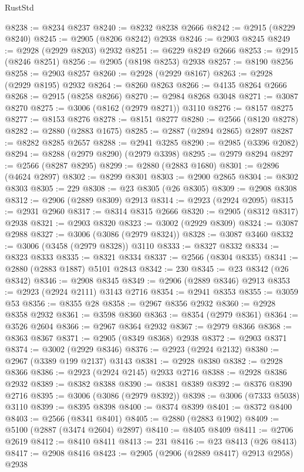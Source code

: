 \begin{lexlean}{RustStd}
\begin{coremodule}
@8238 := @8234 @8237
@8240 := @8232 @8238 @2666
@8242 := @2915 (@8229 @8240)
@8245 := @2905 (@8206 @8242) @2938
@8246 := @2903 @8245
@8249 := @2928 (@2929 @8203) @2932
@8251 := @6229 @8249 @2666
@8253 := @2915 (@8246 @8251)
@8256 := @2905 (@8198 @8253) @2938
@8257 := @8190 @8256
@8258 := @2903 @8257
@8260 := @2928 (@2929 @8167)
@8263 := @2928 (@2929 @8195) @2932
@8264 := @8260 @8263
@8266 := @4135 @8264 @2666
@8268 := @2915 (@8258 @8266)
@8270 := @2984 @8268 @3048
@8271 := @3087 @8270
@8275 := @3006 (@8162 (@2979 @8271)) @3110
@8276 := @8157 @8275
@8277 := @8153 @8276
@8278 := @8151 @8277
@8280 := @2566 (@8120 @8278)
@8282 := @2880 (@2883 @1675)
@8285 := @2887 (@2894 @2865) @2897
@8287 := @8282 @8285 @2657
@8288 := @2941 @3285
@8290 := @2985 (@3396 @2082)
@8294 := @8288 (@2979 @8290) (@2979 @3398)
@8295 := @2979 @8294
@8297 := @2566 (@8287 @8295)
@8299 := @2880 (@2883 @1680)
@8301 := @2896 (@4624 @2897)
@8302 := @8299 @8301
@8303 := @2900 @2865
@8304 := @8302 @8303
@8305 := 229
@8308 := @23 @8305 (@26 @8305)
@8309 := @2908 @8308
@8312 := @2906 (@2889 @8309) @2913
@8314 := @2923 (@2924 @2095)
@8315 := @2931 @2960
@8317 := @8314 @8315 @2666
@8320 := @2905 (@8312 @8317) @2938
@8321 := @2903 @8320
@8323 := @3002 (@2929 @8309)
@8324 := @3087 @2988
@8327 := @3006 (@3086 (@2979 @8324))
@8328 := @3087 @3460
@8332 := @3006 (@3458 (@2979 @8328)) @3110
@8333 := @8327 @8332
@8334 := @8323 @8333
@8335 := @8321 @8334
@8337 := @2566 (@8304 @8335)
@8341 := @2880 (@2883 @1887) @5101 @2843
@8342 := 230
@8345 := @23 @8342 (@26 @8342)
@8346 := @2908 @8345
@8349 := @2906 (@2889 @8346) @2913
@8353 := @2923 (@2924 @2111) @3143 @2716
@8354 := @2941 @8353
@8355 := @3059 @53
@8356 := @8355 @28
@8358 := @2967 @8356 @2932
@8360 := @2928 @8358 @2932
@8361 := @3598 @8360
@8363 := @8354 (@2979 @8361)
@8364 := @3526 @2604
@8366 := @2967 @8364 @2932
@8367 := @2979 @8366
@8368 := @8363 @8367
@8371 := @2905 (@8349 @8368) @2938
@8372 := @2903 @8371
@8374 := @3002 (@2929 @8346)
@8376 := @2923 (@2924 @2132)
@8380 := @2967 (@3389 @199 @2137) @3143
@8381 := @2928 @8380
@8382 := @2928 @8366
@8386 := @2923 (@2924 @2145) @2933 @2716
@8388 := @2928 @8386 @2932
@8389 := @8382 @8388
@8390 := @8381 @8389
@8392 := @8376 @8390 @2716
@8395 := @3006 (@3086 (@2979 @8392))
@8398 := @3006 (@7333 @5038) @3110
@8399 := @8395 @8398
@8400 := @8374 @8399
@8401 := @8372 @8400
@8403 := @2566 (@8341 @8401)
@8405 := @2880 (@2883 @1902)
@8409 := @5100 (@2887 (@3474 @2604) @2897)
@8410 := @8405 @8409
@8411 := @2706 @2619
@8412 := @8410 @8411
@8413 := 231
@8416 := @23 @8413 (@26 @8413)
@8417 := @2908 @8416
@8423 := @2905 (@2906 (@2889 @8417) @2913 @2958) @2938

\end{coremodule}
\end{lexlean}
